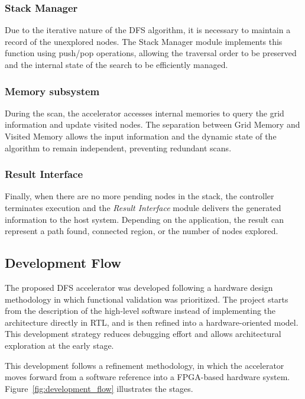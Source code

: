 \documentclass[conference]{IEEEtran}
\begin{document}
\subsubsection{Stack Manager}

Due to the iterative nature of the DFS algorithm, it is necessary to maintain a
record of the unexplored nodes. The Stack Manager module implements this function using
push/pop operations, allowing the traversal order to be preserved and the internal state of the
search to be efficiently managed.

\subsubsection{Memory subsystem}

During the scan, the accelerator accesses internal memories
to query the grid information and update visited nodes.
The separation between Grid Memory and Visited Memory allows the input information 
and the dynamic state of the algorithm to remain independent, preventing redundant scans.

\subsubsection{Result Interface}

Finally, when there are no more pending nodes in the stack, the controller
terminates execution and the \textit{Result Interface} module delivers the generated
information to the host system. Depending on the application, the result
can represent a path found, connected region, or the number of nodes explored.

\subsection{Development Flow}

The proposed DFS accelerator was developed following a hardware design methodology in which functional validation was prioritized. The project starts from the description of the high-level software instead of implementing the architecture directly in RTL, and is then refined into a hardware-oriented model. This development strategy reduces debugging effort and allows architectural exploration at the early stage.

This development follows a refinement methodology, in which the accelerator moves forward from a software reference into a FPGA-based hardware system. Figure~\ref{fig:development_flow} illustrates the stages.
\end{document}
